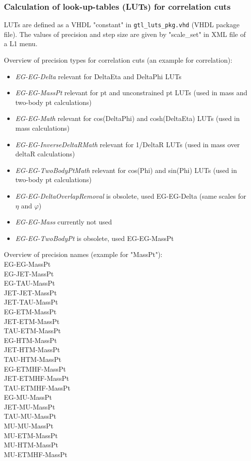 \clearpage

\subsubsection{Calculation of look-up-tables (LUTs) for correlation cuts}
\label{sec:gtl:calc_luts_corr_cuts}

LUTs are defined as a VHDL "constant" in \texttt{gtl\_luts\_pkg.vhd} (VHDL package file).
The values of precision and step size are given by "scale\_set" in XML file of a L1 menu.

Overview of precision types for correlation cuts (an example for \egamma \egamma correlation):
\begin{itemize}
\item \textit{EG-EG-Delta} relevant for DeltaEta and DeltaPhi LUTs
\item \textit{EG-EG-MassPt} relevant for pt and unconstrained pt LUTs (used in mass and two-body pt calculations)
\item \textit{EG-EG-Math} relevant for cos(DeltaPhi) and cosh(DeltaEta) LUTs (used in mass calculations)
\item \textit{EG-EG-InverseDeltaRMath} relevant for 1/DeltaR LUTs (used in mass over deltaR calculations)
\item \textit{EG-EG-TwoBodyPtMath} relevant for cos(Phi) and sin(Phi) LUTs (used in two-body pt calculations)
\item \textit{EG-EG-DeltaOverlapRemoval} is obsolete, used EG-EG-Delta (same scales for $\eta$ and $\varphi$)
\item \textit{EG-EG-Mass} currently not used
\item \textit{EG-EG-TwoBodyPt} is obsolete, used EG-EG-MassPt
\end{itemize}

Overview of precision names (example for "MassPt"):\\
EG-EG-MassPt\\
EG-JET-MassPt\\
EG-TAU-MassPt\\
JET-JET-MassPt\\
JET-TAU-MassPt\\
EG-ETM-MassPt\\
JET-ETM-MassPt\\
TAU-ETM-MassPt\\
EG-HTM-MassPt\\
JET-HTM-MassPt\\
TAU-HTM-MassPt\\
EG-ETMHF-MassPt\\
JET-ETMHF-MassPt\\
TAU-ETMHF-MassPt\\
EG-MU-MassPt\\
JET-MU-MassPt\\
TAU-MU-MassPt\\
MU-MU-MassPt\\
MU-ETM-MassPt\\
MU-HTM-MassPt\\
MU-ETMHF-MassPt\\

